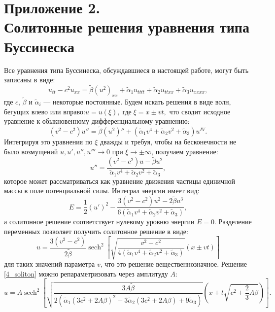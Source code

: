 \documentclass[12pt, a4paper]{report}
\DeclareMathOperator{\sech}{sech}
\newcommand{\lb}{\left (}
\newcommand{\rb}{\right )}
\begin{document}
\chapter*{Приложение 2.\\Солитонные решения уравнения типа Буссинеска}
Все уравнения типа Буссинеска, обсуждавшиеся в настоящей работе, могут быть записаны в виде:
\begin{equation}
u_{tt} - c^2 u_{xx} = \tilde{\beta} (u^2)_{xx} + \tilde\alpha_1 u_{tttt} + \tilde\alpha_2 u_{ttxx} + \tilde\alpha_3 u_{xxxx},
\end{equation}
где $c$, $\tilde\beta$ и $\tilde\alpha_i$ --- некоторые постоянные. Будем искать решения в виде волн, бегущих влево или вправо:$ u = u(\xi), \; \mbox{где} \; \xi = x \pm vt, $
что сводит исходное уравнение к обыкновенному дифференциальному уравнению:
\begin{equation}
(v^2 - c^2) u'' = \tilde\beta (u^2)'' + (\tilde\alpha_1 v^4 + \tilde\alpha_2 v^2 + \tilde\alpha_3) u^{IV}.
\label{ODE}
\end{equation}
Интегрируя это уравнения по $\xi$ дважды и требуя, чтобы на бесконечности не было возмущений $u, u', u'', u''' \to 0$ при $\xi \to \pm \infty$, получаем уравнение:
\begin{equation}
u'' = \frac{(v^2-c^2) u - \tilde\beta u^2}{\tilde\alpha_1 v^4 + \tilde\alpha_2 v^2 + \tilde\alpha_3},
\end{equation}
которое может рассматриваться как уравнение движения частицы единичной массы в поле потенциальной силы. Интеграл энергии имеет вид:
\begin{equation}
E = \frac 12 \left (u' \right )^2 - \frac{3 (v^2-c^2) u^2 - 2 \tilde\beta u^3}{6 (\tilde\alpha_1 v^4 + \tilde\alpha_2 v^2 + \tilde\alpha_3)},
\end{equation}
а солитонное решение соответствует нулевому уровню энергии $E=0$. Разделение переменных позволяет получить солитонное решение в виде:
\begin{equation} \label{4_soliton}
u = \frac{3 (v^2 - c^2)}{2 \tilde\beta} \sech^2 \left [\sqrt{\frac{v^2 - c^2}{4 (\tilde\alpha_1 v^4 + \tilde\alpha_2 v^2 + \tilde\alpha_3)}} (x \pm v t)\right ]
\end{equation}
для таких значений параметра $v$, что это решение вещественнозначное.
Решение \eqref{4_soliton} можно репараметризовать через амплитуду $A$:
\begin{equation}
u = A \sech^2 \left [\sqrt{\frac{3A\tilde{\beta}}{2 (\tilde\alpha_1 (3c^2+2A\beta)^2 + 3\tilde\alpha_2 (3c^2+2A\beta) + 9\tilde\alpha_3)}} \lb x \pm t\sqrt{c^2+\frac23A\beta} \rb\right ].
\end{equation}
	
\end{document}

